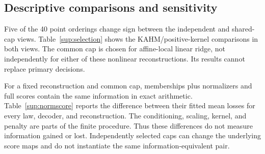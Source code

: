 \begin{table}[htbp]\centering\small\setlength{\tabcolsep}{3.3pt}
\caption{Independent selection, linear decoder: mean SMSE (repetition standard deviation).}\label{sup:indlin}

\end{table}
\begin{table}[htbp]\centering\small\setlength{\tabcolsep}{3.3pt}
\caption{Independent selection, nonlinear decoder: mean SMSE (repetition standard deviation).}\label{sup:indnon}

\end{table}
\FloatBarrier
\begin{table}[htbp]\centering\small\setlength{\tabcolsep}{3.3pt}
\caption{Shared cap, linear decoder: mean SMSE (repetition standard deviation). The bank is selected by affine-local linear ridge on B.}\label{sup:shlin}

\end{table}
\begin{table}[htbp]\centering\small\setlength{\tabcolsep}{3.3pt}
\caption{Shared cap, nonlinear decoder: mean SMSE (repetition standard deviation). Each procedure selects its own within-cap decoder settings.}\label{sup:shnon}

\end{table}
\FloatBarrier

\subsection{Descriptive comparisons and sensitivity}
Five of the 40 point orderings change sign between the independent and shared-cap views. Table~\ref{sup:selection} shows the KAHM/positive-kernel comparisons in both views. The common cap is chosen for affine-local linear ridge, not independently for either of these nonlinear reconstructions. Its results cannot replace primary decisions.

For a fixed reconstruction and common cap, memberships plus normalizers and full scores contain the same information in exact arithmetic. Table~\ref{sup:normscore} reports the difference between their fitted mean losses for every law, decoder, and reconstruction. The conditioning, scaling, kernel, and penalty are parts of the finite procedure. Thus these differences do not measure information gained or lost. Independently selected caps can change the underlying score maps and do not instantiate the same information-equivalent pair.

\begin{table}[htbp]\centering\small
\caption{KAHM-local versus positive-kernel-local: point relative gains under both cap rules. Shared-cap values are descriptive. Only the last column reports a primary interval decision.}\label{sup:selection}

\end{table}
\begin{table}[htbp]\centering\small
\caption{Same-bank normalizer-encoding loss minus full-score loss, in mean SMSE. Negative values favor normalizers. All 24 values are descriptive, without new significance labels.}\label{sup:normscore}

\end{table}
\FloatBarrier

